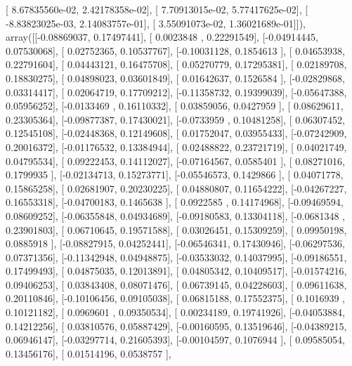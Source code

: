 \documentclass{article}
\begin{document}
       [  8.67835560e-02,   2.42178358e-02],
       [  7.70913015e-02,   5.77417625e-02],
       [ -8.83823025e-03,   2.14083757e-01],
       [  3.55091073e-02,   1.36021689e-01]]), array([[-0.08869037,  0.17497441],
       [ 0.0023848 ,  0.22291549],
       [-0.04914445,  0.07530068],
       [ 0.02752365,  0.10537767],
       [-0.10031128,  0.1854613 ],
       [ 0.04653938,  0.22791604],
       [ 0.04443121,  0.16475708],
       [ 0.05270779,  0.17295381],
       [ 0.02189708,  0.18830275],
       [ 0.04898023,  0.03601849],
       [ 0.01642637,  0.1526584 ],
       [-0.02829868,  0.03314417],
       [ 0.02064719,  0.17709212],
       [-0.11358732,  0.19399039],
       [-0.05647388,  0.05956252],
       [-0.0133469 ,  0.16110332],
       [ 0.03859056,  0.0427959 ],
       [ 0.08629611,  0.23305364],
       [-0.09877387,  0.17430021],
       [-0.0733959 ,  0.10481258],
       [ 0.06307452,  0.12545108],
       [-0.02448368,  0.12149608],
       [ 0.01752047,  0.03955433],
       [-0.07242909,  0.20016372],
       [-0.01176532,  0.13384944],
       [ 0.02488822,  0.23721719],
       [ 0.04021749,  0.04795534],
       [ 0.09222453,  0.14112027],
       [-0.07164567,  0.0585401 ],
       [ 0.08271016,  0.1799935 ],
       [-0.02134713,  0.15273771],
       [-0.05546573,  0.1429866 ],
       [ 0.04071778,  0.15865258],
       [ 0.02681907,  0.20230225],
       [ 0.04880807,  0.11654222],
       [-0.04267227,  0.16553318],
       [-0.04700183,  0.1465638 ],
       [ 0.0922585 ,  0.14174968],
       [-0.09469594,  0.08609252],
       [-0.06355848,  0.04934689],
       [-0.09180583,  0.13304118],
       [-0.0681348 ,  0.23901803],
       [ 0.06710645,  0.19571588],
       [ 0.03026451,  0.15309259],
       [ 0.09950198,  0.0885918 ],
       [-0.08827915,  0.04252441],
       [-0.06546341,  0.17430946],
       [-0.06297536,  0.07371356],
       [-0.11342948,  0.04948875],
       [-0.03533032,  0.14037995],
       [-0.09186551,  0.17499493],
       [ 0.04875035,  0.12013891],
       [ 0.04805342,  0.10409517],
       [-0.01574216,  0.09406253],
       [ 0.03843408,  0.08071476],
       [ 0.06739145,  0.04228603],
       [ 0.09611638,  0.20110846],
       [-0.10106456,  0.09105038],
       [ 0.06815188,  0.17552375],
       [ 0.1016939 ,  0.10121182],
       [ 0.0969601 ,  0.09350534],
       [ 0.00234189,  0.19741926],
       [-0.04053884,  0.14212256],
       [ 0.03810576,  0.05887429],
       [-0.00160595,  0.13519646],
       [-0.04389215,  0.06946147],
       [-0.03297714,  0.21605393],
       [-0.00104597,  0.1076944 ],
       [ 0.09585054,  0.13456176],
       [ 0.01514196,  0.0538757 ],
\end{document}
